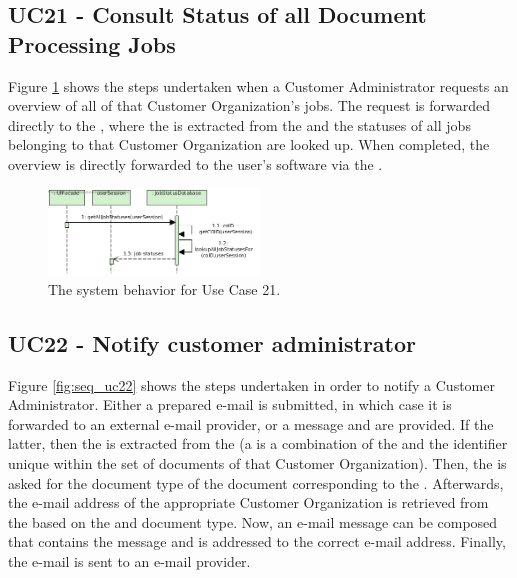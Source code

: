 \subsection{UC21 - Consult Status of all Document Processing Jobs}
Figure \ref{fig:seq_uc21} shows the steps undertaken when a Customer Administrator requests an overview of all of that Customer Organization's jobs. The request is forwarded directly to the , where the  is extracted from the  and the statuses of all jobs belonging to that Customer Organization are looked up. When completed, the overview is directly forwarded to the user's software via the .

\begin{figure}[!htp]
    \centering
    \includegraphics[width=0.5\textwidth]{figures/UC21 - Consult Status of all Document Processing Jobs.png}
    \caption{The system behavior for Use Case 21.
        }\label{fig:seq_uc21}
\end{figure}

\subsection{UC22 - Notify customer administrator}
Figure \ref{fig:seq_uc22} shows the steps undertaken in order to notify a Customer Administrator. Either a prepared e-mail is submitted, in which case it is forwarded to an external e-mail provider, or a message and  are provided. If the latter, then the  is extracted from the  (a  is a combination of the  and the identifier unique within the set of documents of that Customer Organization). Then, the  is asked for the document type of the document corresponding to the . Afterwards, the e-mail address of the appropriate Customer Organization is retrieved from the  based on the  and document type. Now, an e-mail message can be composed that contains the message and is addressed to the correct e-mail address. Finally, the e-mail is sent to an e-mail provider.

